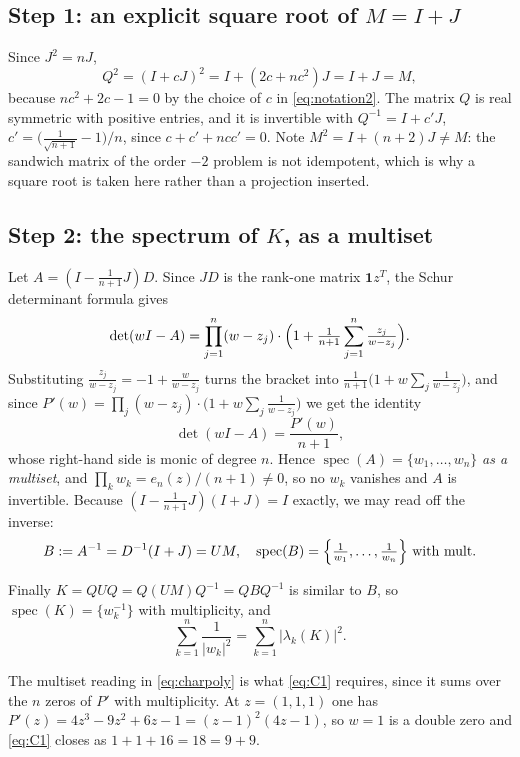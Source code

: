 \documentclass[11pt]{amsart}
\theoremstyle{remark}
\newcommand{\spec}{\operatorname{spec}}
\begin{document}
\subsection*{Step 1: an explicit square root of $M=I+J$}

Since $J^{2}=nJ$,
\[
  Q^{2}=(I+cJ)^{2}=I+(2c+nc^{2})J=I+J=M,
\]
because $nc^{2}+2c-1=0$ by the choice of $c$ in \eqref{eq:notation2}. The
matrix $Q$ is real symmetric with positive entries, and it is invertible with
$Q^{-1}=I+c'J$, $c'=\bigl(\tfrac{1}{\sqrt{n+1}}-1\bigr)/n$, since
$c+c'+ncc'=0$. Note $M^{2}=I+(n+2)J\ne M$: the sandwich matrix of the order
$-2$ problem is not idempotent, which is why a square root is taken here
rather than a projection inserted.

\subsection*{Step 2: the spectrum of $K$, as a multiset}

Let $A=(I-\tfrac{1}{n+1}J)D$. Since $JD$ is the rank-one matrix $\mathbf1z^{T}$,
the Schur determinant formula gives
\[
  \det(wI-A)
  =\prod_{j=1}^{n}(w-z_j)\cdot
   \Bigl(1+\tfrac{1}{n+1}\sum_{j=1}^{n}\tfrac{z_j}{w-z_j}\Bigr).
\]
Substituting $\tfrac{z_j}{w-z_j}=-1+\tfrac{w}{w-z_j}$ turns the bracket into
$\tfrac{1}{n+1}\bigl(1+w\sum_j\tfrac{1}{w-z_j}\bigr)$, and since
$P'(w)=\prod_j(w-z_j)\cdot\bigl(1+w\sum_j\tfrac{1}{w-z_j}\bigr)$ we get the
identity
\begin{equation}\label{eq:charpoly}
  \det(wI-A)=\frac{P'(w)}{n+1},
\end{equation}
whose right-hand side is monic of degree $n$. Hence
$\spec(A)=\{w_1,\ldots,w_n\}$ \emph{as a multiset}, and
$\prod_kw_k=e_n(z)/(n+1)\ne0$, so no $w_k$ vanishes and $A$ is invertible.
Because $(I-\tfrac{1}{n+1}J)(I+J)=I$ exactly, we may read off the inverse:
\begin{equation}\label{eq:B}
  B:=A^{-1}=D^{-1}(I+J)=UM,
  \quad
  \spec(B)=\Bigl\{\tfrac{1}{w_1},\ldots,\tfrac{1}{w_n}\Bigr\}
  \ \text{with mult.}
\end{equation}

Finally $K=QUQ=Q(UM)Q^{-1}=QBQ^{-1}$ is similar to $B$, so
$\spec(K)=\{w_k^{-1}\}$ with multiplicity, and
\begin{equation}\label{eq:lhs}
  \sum_{k=1}^{n}\frac{1}{|w_k|^{2}}
  =\sum_{k=1}^{n}\bigl|\lambda_k(K)\bigr|^{2}.
\end{equation}

The multiset reading in \eqref{eq:charpoly} is what \eqref{eq:C1} requires,
since it sums over the $n$ zeros of $P'$ with multiplicity. At $z=(1,1,1)$ one
has $P'(z)=4z^{3}-9z^{2}+6z-1=(z-1)^{2}(4z-1)$, so $w=1$ is a double zero and
\eqref{eq:C1} closes as $1+1+16=18=9+9$.
\end{document}
